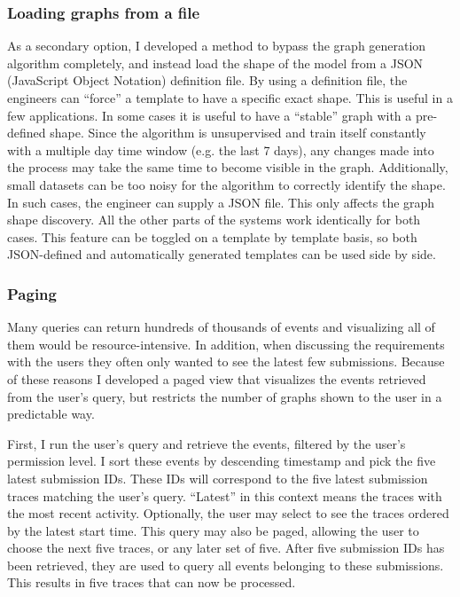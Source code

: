 \subsubsection{Loading graphs from a file}
\label{sec:jsonfile}

As a secondary option, I developed a method to bypass the graph generation algorithm completely, and instead load the shape of the model from a JSON (JavaScript Object Notation) definition file.
By using a definition file, the engineers can ``force'' a template to have a specific exact shape.
This is useful in a few applications.
In some cases it is useful to have a ``stable'' graph with a pre-defined shape.
Since the algorithm is unsupervised and train itself constantly with a multiple day time window (e.g. the last 7 days), any changes made into the process may take the same time to become visible in the graph.
Additionally, small datasets can be too noisy for the algorithm to correctly identify the shape.
In such cases, the engineer can supply a JSON file.
This only affects the graph shape discovery. 
All the other parts of the systems work identically for both cases.
This feature can be toggled on a template by template basis, so both JSON-defined and automatically generated templates can be used side by side.

\subsubsection{Paging}
\label{sec:paging}

Many queries can return hundreds of thousands of events and visualizing all of them would be resource-intensive.
In addition, when discussing the requirements with the users they often only wanted to see the latest few submissions.
Because of these reasons I developed a paged view that visualizes the events retrieved from the user's query, but restricts the number of graphs shown to the user in a predictable way.

First, I run the user's query and retrieve the events, filtered by the user's permission level.
I sort these events by descending timestamp and pick the five latest submission IDs.
These IDs will correspond to the five latest submission traces matching the user's query.
``Latest'' in this context means the traces with the most recent activity.
Optionally, the user may select to see the traces ordered by the latest start time.
This query may also be paged, allowing the user to choose the next five traces, or any later set of five.
After five submission IDs has been retrieved, they are used to query all events belonging to these submissions. This results in five traces that can now be processed.

